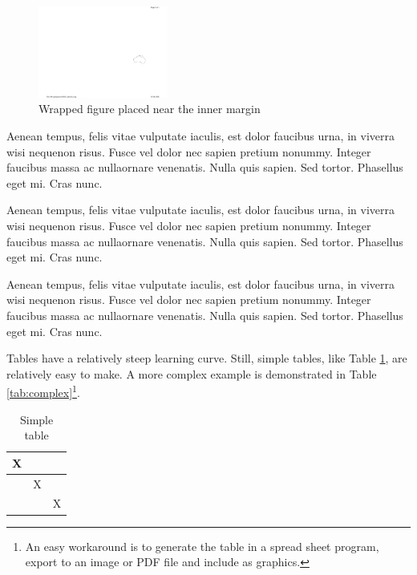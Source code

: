 \begin{figure}
  \centering 
  \includegraphics[width=0.38\textwidth]{Graphics/introaustralia}
  \caption{Wrapped figure placed near the inner margin}
  \label{fig:wrap-inner}
\end{figure}

Aenean tempus, felis vitae vulputate iaculis, est dolor faucibus urna, in viverra wisi nequenon risus. Fusce vel dolor nec sapien pretium nonummy. Integer faucibus massa ac nullaornare venenatis. Nulla quis sapien. Sed tortor. Phasellus eget mi. Cras nunc.

Aenean tempus, felis vitae vulputate iaculis, est dolor faucibus urna, in viverra wisi nequenon risus. Fusce vel dolor nec sapien pretium nonummy. Integer faucibus massa ac nullaornare venenatis. Nulla quis sapien. Sed tortor. Phasellus eget mi. Cras nunc.

Aenean tempus, felis vitae vulputate iaculis, est dolor faucibus urna, in viverra wisi nequenon risus. Fusce vel dolor nec sapien pretium nonummy. Integer faucibus massa ac nullaornare venenatis. Nulla quis sapien. Sed tortor. Phasellus eget mi. Cras nunc.

Tables have a relatively steep learning curve.
Still, simple tables, like Table \ref{tab:simple}, are relatively easy to make.
A more complex example is demonstrated in Table \ref{tab:complex}\footnote{An easy workaround is to generate the table in a spread sheet program, export to an image or PDF file and include as graphics.}.

\begin{table}[!htbp]
\centering
\begin{tabular}{c|c|c}
X &  & \\
\hline
& X & \\
\hline
 &  & X \\
\end{tabular}
\caption{Simple table}
\label{tab:simple}
\end{table}

